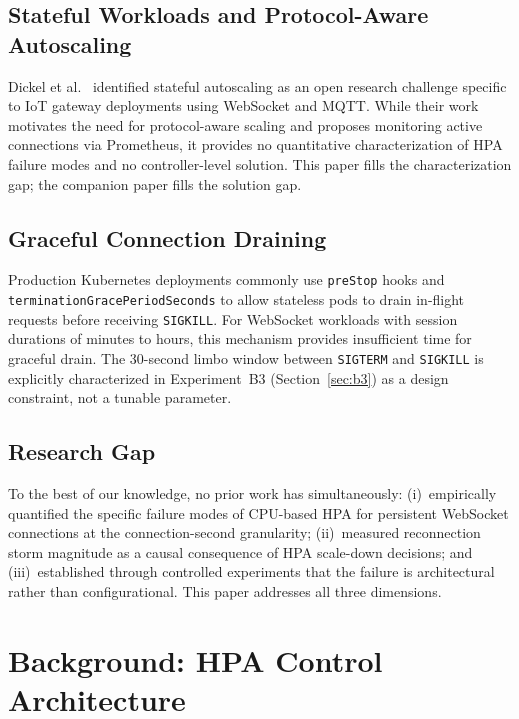 \documentclass[twocolumn]{svjour3}
\begin{document}
\subsection{Stateful Workloads and Protocol-Aware Autoscaling}

Dickel et al.~\cite{dickel2019stateful} identified stateful autoscaling as an open research
challenge specific to IoT gateway deployments using WebSocket and MQTT. While their work
motivates the need for protocol-aware scaling and proposes monitoring active connections via
Prometheus, it provides no quantitative characterization of HPA failure modes and no
controller-level solution. This paper fills the characterization gap; the companion paper
fills the solution gap.

\subsection{Graceful Connection Draining}

Production Kubernetes deployments commonly use \texttt{preStop} hooks and
\texttt{terminationGracePeriodSeconds} to allow stateless pods to drain in-flight requests
before receiving \texttt{SIGKILL}. For WebSocket workloads with session durations of
minutes to hours, this mechanism provides insufficient time for graceful drain. The
30-second limbo window between \texttt{SIGTERM} and \texttt{SIGKILL} is explicitly
characterized in Experiment~B3 (Section~\ref{sec:b3}) as a design constraint, not a tunable
parameter.

\subsection{Research Gap}

To the best of our knowledge, no prior work has simultaneously:
(i)~empirically quantified the specific failure modes of CPU-based HPA for persistent
WebSocket connections at the connection-second granularity;
(ii)~measured reconnection storm magnitude as a causal consequence of HPA scale-down
decisions; and
(iii)~established through controlled experiments that the failure is architectural rather
than configurational.
This paper addresses all three dimensions.



\section{Background: HPA Control Architecture}
\label{sec:background}
\end{document}
